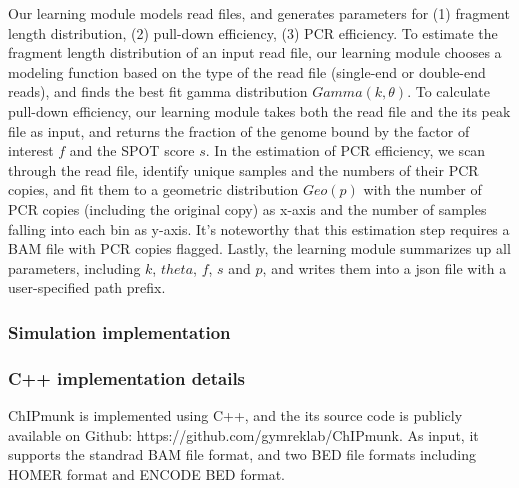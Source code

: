 \documentclass[12pt]{article}
\begin{document}
Our learning module models read files, and generates parameters for 
(1) fragment length distribution, (2) pull-down efficiency, (3) PCR efficiency.
To estimate the fragment length distribution of an input read file,
our learning module chooses a modeling function based on the type of the read file (single-end or double-end reads),
and finds the best fit gamma distribution $Gamma (k, \theta)$.
To calculate pull-down efficiency, our learning module takes both the read file and the its peak file as input,
and returns the fraction of the genome bound by the factor of interest $f$ and the SPOT score $s$.
In the estimation of PCR efficiency, we scan through the read file, 
identify unique samples and the numbers of their PCR copies,
and fit them to a geometric distribution $Geo(p)$ with the number of PCR copies (including the original copy)
as x-axis and the number of samples falling into each bin as y-axis.
It’s noteworthy that this estimation step requires a BAM file with PCR copies flagged. Lastly, the learning module summarizes up all parameters, including $k$, $theta$, $f$, $s$ and $p$, and writes them into a json file with a user-specified path prefix.

\subsubsection*{Simulation implementation}




\subsubsection*{C++ implementation details}
ChIPmunk is implemented using C++, and the its source code is publicly available on Github: https://github.com/gymreklab/ChIPmunk.
As input, it supports the standrad BAM file format, and two BED file formats including HOMER format and ENCODE BED format.
\end{document}
